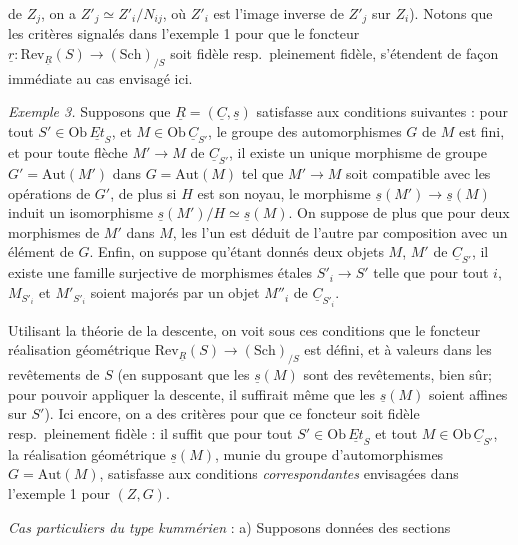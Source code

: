 \documentclass[11pt,a4paper]{article}
\begin{document}
de $Z_j$, on a $Z'_j \simeq Z'_i/N_{ij}$, où $Z'_i$ est l'image inverse de
$Z'_j$ sur $Z_i$). Notons que les critères signalés dans l'exemple 1 pour que
le foncteur $\underline{r} : \mathrm{Rev}_{\underline{R}}(S) \to
(\mathrm{Sch})_{/S}$ soit fidèle resp.\ pleinement fidèle, s'étendent de façon
immédiate au cas envisagé ici.

\emph{Exemple 3.} Supposons que $\underline{R} = (\underline{C}, \underline{s})$
satisfasse aux conditions suivantes : pour tout $S' \in
\mathrm{Ob}\,\underline{Et}_S$, et $M \in \mathrm{Ob}\,\underline{C}_{S'}$, le
groupe des automorphismes $G$ de $M$ est fini, et pour toute flèche $M' \to M$
de $\underline{C}_{S'}$, il existe un unique morphisme de groupe $G' =
\mathrm{Aut}(M')$ dans $G = \mathrm{Aut}(M)$ tel que $M' \to M$ soit compatible
avec les opérations de $G'$, de plus si $H$ est son noyau, le morphisme
$\underline{s}(M') \to \underline{s}(M)$ induit un isomorphisme
$\underline{s}(M')/H \simeq \underline{s}(M)$.  On suppose
 de plus que pour deux morphismes de $M'$ dans $M$,
\struck{\ill{}} les \struck{\ill{}} l'un est déduit de l'autre par composition
avec un élément de $G$. Enfin, on suppose qu'étant donnés deux objets $M$, $M'$
de $\underline{C}_{S'}$, il existe une famille surjective de morphismes étales
$S'_i \to S'$ telle que pour tout $i$, $M_{S'_i}$ et $M'_{S'_i}$ soient majorés
par un objet $M''_i$ de $\underline{C}_{S'_i}$.

Utilisant la théorie de la descente, on voit sous ces conditions que le
foncteur réalisation géométrique $\mathrm{Rev}_{\underline{R}}(S) \to
(\mathrm{Sch})_{/S}$ est défini, et à valeurs dans les  revêtements de $S$ (en supposant que les $\underline{s}(M)$ sont des
revêtements, bien sûr; pour pouvoir appliquer la descente, il suffirait même
que les $\underline{s}(M)$ soient affines sur $S'$). Ici encore, on a des
critères pour que ce foncteur soit fidèle resp.\ pleinement fidèle : il suffit
que pour tout $S' \in \mathrm{Ob}\,\underline{Et}_S$ et tout $M \in
\mathrm{Ob}\,\underline{C}_{S'}$, la réalisation géométrique
$\underline{s}(M)$, munie du groupe d'automorphismes $G = \mathrm{Aut}(M)$,
satisfasse aux conditions \emph{correspondantes} envisagées dans l'exemple 1
pour $(Z,G)$.

\emph{Cas particuliers du type kummérien} : a) Supposons données des sections
\end{document}

